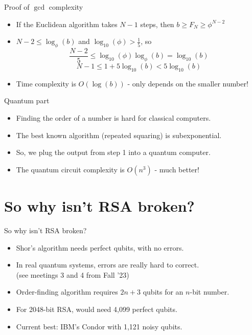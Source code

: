 \documentclass[handout, aspectratio=169]{beamer}
\begin{document}
\begin{frame}{Proof of $\gcd$ complexity}
    \begin{itemize}
        \item If the Euclidean algorithm takes $N-1$ steps, then $b\geq F_N\geq \phi^{N-2}$ \pause
        \item $N-2\leq \log_\phi(b)$ and $\log_{10}(\phi)>\frac{1}{5}$, so
        \begin{equation*}
            \frac{N-2}{5}\leq \log_{10}(\phi)\log_\phi(b)=\log_{10}(b)
        \end{equation*} \pause
        \begin{equation*}
            N-1\leq 1+5\log_{10}(b)<5\log_{10}(b)
        \end{equation*} \pause
        \item Time complexity is $O(\log(b))$ - only depends on the smaller number!
    \end{itemize}
\end{frame}

\begin{frame}{Quantum part}
    \begin{itemize}
        \item Finding the order of a number is hard for classical computers. \pause
        \item The best known algorithm (repeated squaring) is subexponential. \pause
        \item So, we plug the output from step 1 into a quantum computer. \pause
        \item The quantum circuit complexity is $O(n^3)$ - much better!
    \end{itemize}
\end{frame}

\section{So why isn't RSA broken?}
\frame{\sectionpage}

\begin{frame}{So why isn't RSA broken?}
    \begin{itemize}
        \item Shor's algorithm needs perfect qubits, with no errors. \pause
        \item In real quantum systems, errors are really hard to correct. \\
        (see meetings 3 and 4 from Fall '23) \pause
        \item Order-finding algorithm requires $2n+3$ qubits for an $n$-bit number. \pause
        \item For 2048-bit RSA, would need 4,099 perfect qubits. \pause
        \item Current best: IBM's Condor with 1,121 noisy qubits.
    \end{itemize}
\end{frame}
\end{document}
